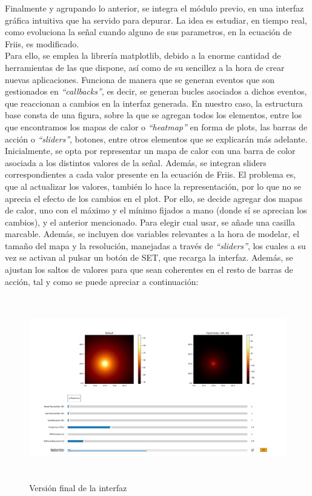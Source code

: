 Finalmente y agrupando lo anterior, se integra el módulo previo, en una interfaz gráfica intuitiva que ha servido para depurar. La idea es estudiar, en tiempo real, como evoluciona la señal cuando alguno de sus parametros, en la ecuación de Friis, es modificado.\\

Para ello, se emplea la librería matplotlib, debido a la enorme cantidad de herramientas de las que dispone, así como de su sencillez a la hora de crear nuevas aplicaciones. Funciona de manera que se generan eventos que son gestionados en \emph{``callbacks''}, es decir, se generan bucles asociados a dichos eventos, que reaccionan a cambios en la interfaz generada. En nuestro caso, la estructura base consta de una figura, sobre la que se agregan todos los elementos, entre los que encontramos los mapas de calor o \emph{``heatmap''} en forma de plots, las barras de acción o \emph{``sliders''}, botones, entre otros elementos que se explicarán más adelante.\\

Inicialmente, se opta por representar un mapa de calor con una barra de color asociada a los distintos valores de la señal. Además, se integran sliders correspondientes a cada valor presente en la ecuación de Friis. El problema es, que al actualizar los valores, también lo hace la representación, por lo que no se aprecia el efecto de los cambios en el plot. Por ello, se decide agregar dos mapas de calor, uno con el máximo y el mínimo fijados a mano (donde sí se aprecian los cambios), y el anterior mencionado. Para elegir cual usar, se añade una casilla marcable. Además, se incluyen dos variables relevantes a la hora de modelar, el tamaño del mapa y la resolución, manejadas a través de \emph{``sliders''}, los cuales a su vez se activan al pulsar un botón de SET, que recarga la interfaz. Además, se ajustan los saltos de valores para que sean coherentes en el resto de barras de acción, tal y como se puede apreciar a continuación:\\

\begin{figure} [H]
    \begin{center}
    \includegraphics[height=8cm]{imagenes/cap4/7_Friss_endGUI.png}
    \end{center}
	\caption[Versión final de la interfaz]{Versión final de la interfaz}
	\label{fig:friis_end_app}
\end{figure}

